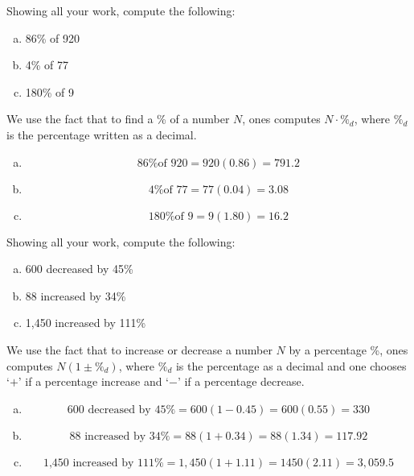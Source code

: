 \documentclass[11pt,letterpaper]{article}
\begin{document}

 Showing all your work, compute the following:
	\begin{enumerate}[(a)]
	\item 86\% of 920
	\item 4\% of 77
	\item 180\% of 9
	\end{enumerate} \pspace

\sol We use the fact that to find a \% of a number $N$, ones computes $N \cdot \%_d$, where $\%_d$ is the percentage written as a decimal. 
 
\begin{enumerate}[(a)]
\item 
	\[
	\text{86\% of 920}= 920(0.86)= 791.2
	\]

\item 
	\[
	\text{4\% of 77}= 77(0.04)= 3.08
	\] \pspace

\item 
	\[
	\text{180\% of 9}= 9(1.80)= 16.2
	\]
\end{enumerate}



\newpage



 Showing all your work, compute the following:
	\begin{enumerate}[(a)]
	\item 600 decreased by 45\%
	\item 88 increased by 34\%
	\item 1,450 increased by 111\%
	\end{enumerate} \pspace

\sol We use the fact that to increase or decrease a number $N$ by a percentage \%, ones computes $N(1 \pm \%_d)$, where $\%_d$ is the percentage as a decimal and one chooses `$+$' if a percentage increase and `$-$' if a percentage decrease. \pspace

\begin{enumerate}[(a)]
\item 
	\[
	\text{600 decreased by 45\%}= 600 (1 - 0.45)= 600(0.55)= 330
	\] \pspace

\item 
	\[
	\text{88 increased by 34\%}= 88 (1 + 0.34)= 88(1.34)= 117.92
	\] \pspace

\item 
	\[
	\text{1,450 increased by 111\%}= 1,\!450 (1 + 1.11)= 1450(2.11)= 3,\!059.5
	\] 
\end{enumerate}
\end{document}
